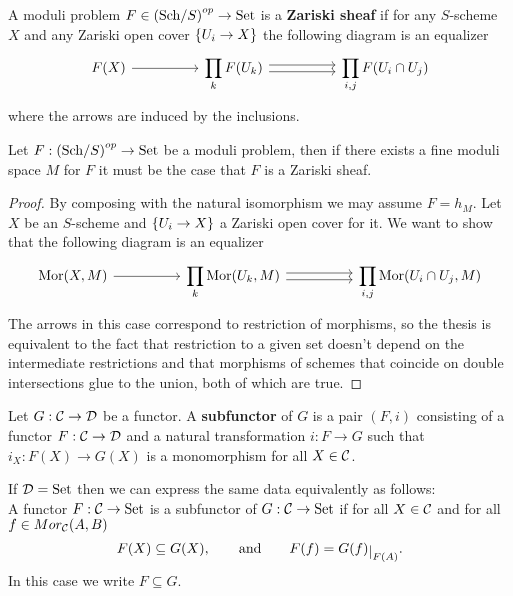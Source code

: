\begin{definition}
A moduli problem $F\in \left({\mathrm{Sch}}/{S}\right)^{op}\to \mathrm{Set}$ is a \textbf{Zariski sheaf} if for any $S$-scheme $X$ and any Zariski open cover $\left\{{U_i\to X}\right\}$ the following diagram is an equalizer
\[\begin{tikzcd}
	{F(X)} && {\displaystyle \prod_k F(U_k)} && {\displaystyle \prod_{i,j}F(U_i\cap U_j)}
	\arrow[from=1-1, to=1-3]
	\arrow[shift left, from=1-3, to=1-5]
	\arrow[shift right, from=1-3, to=1-5]
\end{tikzcd}\]
where the arrows are induced by the inclusions.
\end{definition}


\begin{proposition}
Let $F:\left({\mathrm{Sch}}/{S}\right)^{op}\to \mathrm{Set}$ be a moduli problem, then if there exists a fine moduli space $M$ for $F$ it must be the case that $F$ is a Zariski sheaf.
\end{proposition}
\begin{proof}
By composing with the natural isomorphism we may assume $F=h_M$. Let $X$ be an $S$-scheme and $\left\{{U_i\to X}\right\}$ a Zariski open cover for it. We want to show that the following diagram is an equalizer
\[\begin{tikzcd}
	{\Mor(X,M)} && {\displaystyle \prod_k \Mor(U_k,M)} && {\displaystyle \prod_{i,j}\Mor(U_i\cap U_j,M)}
	\arrow[from=1-1, to=1-3]
	\arrow[shift left, from=1-3, to=1-5]
	\arrow[shift right, from=1-3, to=1-5]
\end{tikzcd}\]
The arrows in this case correspond to restriction of morphisms, so the thesis is equivalent to the fact that restriction to a given set doesn't depend on the intermediate restrictions and that morphisms of schemes that coincide on double intersections glue to the union, both of which are true.
\end{proof}


\begin{definition}[Subfunctor]
Let $G:\mathcal{C}\to \mathcal{D}$ be a functor. A \textbf{subfunctor} of $G$ is a pair $(F,i)$ consisting of a functor $F:\mathcal{C}\to \mathcal{D}$ and a natural transformation $i:F\to G$ such that $i_X:F(X)\to G(X)$ is a monomorphism for all $X\in \mathcal{C}$.
\end{definition}
\begin{remark}
If $\mathcal{D}=\mathrm{Set}$ then we can express the same data equivalently as follows:\\
A functor $F:\mathcal{C}\to \mathrm{Set}$ is a subfunctor of $G:\mathcal{C}\to \mathrm{Set}$ if for all $X\in \mathcal{C}$ and for all $f\in Mor_{\mathcal{C}}(A,B)$
\[F(X)\subseteq G(X),\qquad\text{and}\qquad F(f)=G(f)\res{F(A)}.\]
In this case we write $F\subseteq G$.
\end{remark}

